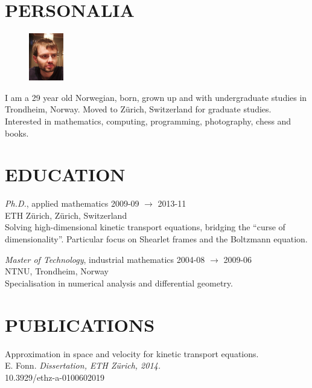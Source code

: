 \documentclass[line,margin]{res}
\newcommand{\zh}{Z\"{u}rich}
\begin{document}
\address{Høgreina 394, NO-7079 Flatåsen}
\address{+41 41 44 98 89, evfonn@gmail.com}


\begin{resume}

\section{PERSONALIA}

\begin{figure}
  \vspace{-0.6cm}
  \includegraphics[width=1.5cm]{photo.png}
\end{figure}

I am a 29 year old Norwegian, born, grown up and with undergraduate studies in Trondheim,
Norway. Moved to Zürich, Switzerland for graduate studies. Interested in mathematics, computing,
programming, photography, chess and books.


\section{EDUCATION} 

{\em Ph.D.}, applied mathematics \hfill 2009-09 $\to$ 2013-11 \\
ETH \zh, \zh, Switzerland \\
Solving high-dimensional kinetic transport equations, bridging the ``curse of
dimensionality''. Particular focus on Shearlet frames and the Boltzmann equation.

{\em Master of Technology}, industrial mathematics \hfill 2004-08 $\to$ 2009-06 \\
NTNU, Trondheim, Norway \\
Specialisation in numerical analysis and differential geometry.


\section{PUBLICATIONS}

Approximation in space and velocity for kinetic transport equations. \\
E. Fonn. {\em Dissertation, ETH \zh, 2014.} \\
10.3929/ethz-a-0100602019


\end{resume}
\end{document}

